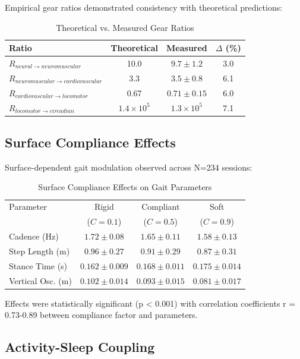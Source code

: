 \documentclass[12pt,twocolumn]{article}
\begin{document}
Empirical gear ratios demonstrated consistency with theoretical predictions:

\begin{table}[H]
\centering
\caption{Theoretical vs. Measured Gear Ratios}
\begin{tabular}{lccc}
\toprule
Ratio & Theoretical & Measured & $\Delta$ (\%) \\
\midrule
$R_{neural \to neuromuscular}$ & 10.0 & $9.7 \pm 1.2$ & 3.0 \\
$R_{neuromuscular \to cardiovascular}$ & 3.3 & $3.5 \pm 0.8$ & 6.1 \\
$R_{cardiovascular \to locomotor}$ & 0.67 & $0.71 \pm 0.15$ & 6.0 \\
$R_{locomotor \to circadian}$ & $1.4 \times 10^{5}$ & $1.3 \times 10^{5}$ & 7.1 \\
\bottomrule
\end{tabular}
\end{table}

\subsection{Surface Compliance Effects}

Surface-dependent gait modulation observed across N=234 sessions:

\begin{table}[H]
\centering
\caption{Surface Compliance Effects on Gait Parameters}
\begin{tabular}{lccc}
\toprule
Parameter & Rigid & Compliant & Soft \\
 & ($C=0.1$) & ($C=0.5$) & ($C=0.9$) \\
\midrule
Cadence (Hz) & $1.72 \pm 0.08$ & $1.65 \pm 0.11$ & $1.58 \pm 0.13$ \\
Step Length (m) & $0.96 \pm 0.27$ & $0.91 \pm 0.29$ & $0.87 \pm 0.31$ \\
Stance Time (s) & $0.162 \pm 0.009$ & $0.168 \pm 0.011$ & $0.175 \pm 0.014$ \\
Vertical Osc. (m) & $0.102 \pm 0.014$ & $0.093 \pm 0.015$ & $0.081 \pm 0.017$ \\
\bottomrule
\end{tabular}
\end{table}

Effects were statistically significant (p < 0.001) with correlation coefficients r = 0.73-0.89 between compliance factor and parameters.

\subsection{Activity-Sleep Coupling}
\end{document}
